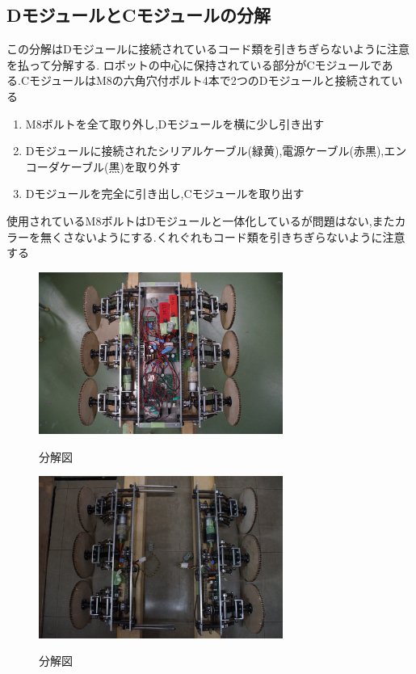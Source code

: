 \subsection{DモジュールとCモジュールの分解}
この分解はDモジュールに接続されているコード類を引きちぎらないように注意を払って分解する.
ロボットの中心に保持されている部分がCモジュールである.CモジュールはM8の六角穴付ボルト4本で2つのDモジュールと接続されている
\begin{enumerate}
 \item M8ボルトを全て取り外し,Dモジュールを横に少し引き出す
 \item Dモジュールに接続されたシリアルケーブル(緑黄),電源ケーブル(赤黒),エンコーダケーブル(黒)を取り外す
 \item Dモジュールを完全に引き出し,Cモジュールを取り出す
\end{enumerate}
使用されているM8ボルトはDモジュールと一体化しているが問題はない,またカラーを無くさないようにする.くれぐれもコード類を引きちぎらないように注意する

\begin{figure}[htp]
 \begin{center}
  \includegraphics[width=80mm]{img/hard/f12.jpg}
 　\caption{分解図}
  \label{fig:robot}%
 \end{center}
\end{figure}


\begin{figure}[htp]
 \begin{center}
  \includegraphics[width=80mm]{img/hard/f10.jpg}
 　\caption{分解図}
  \label{fig:robot}%
 \end{center}
\end{figure}

